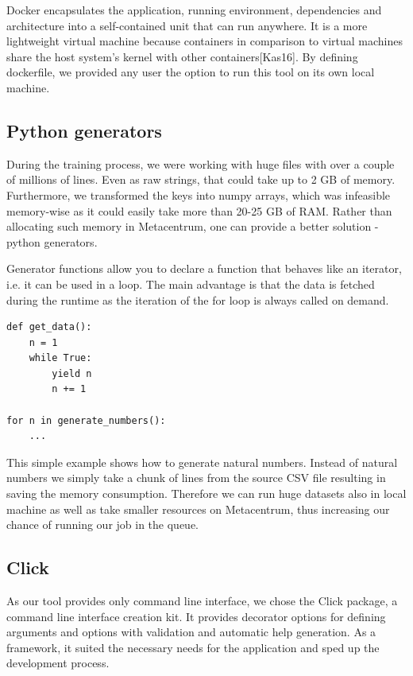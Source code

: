 Docker encapsulates the application, running environment, dependencies and architecture into a self-contained unit that can run anywhere. It is a more lightweight virtual machine because containers in comparison to virtual machines share the host system’s kernel with other containers[Kas16]. By defining dockerfile, we provided any user the option to run this tool on its own local machine.

\subsection{Python generators}

\label{python-generators}

During the training process, we were working with huge files with over a couple of millions of lines. Even as raw strings, that could take up to 2 GB of memory. Furthermore, we transformed the keys into numpy arrays, which was infeasible memory-wise as it could easily take more than 20-25 GB of RAM. Rather than allocating such memory in Metacentrum, one can provide a better solution - python generators\cite{python-gen}. 

Generator functions allow you to declare a function that behaves like an iterator, i.e. it can be used in a loop. The main advantage is that the data is fetched during the runtime as the iteration of the for loop is always called on demand.

\begin{verbatim}
def get_data():
    n = 1
    while True:
        yield n
        n += 1
		
for n in generate_numbers():
    ...
\end{verbatim}

This simple example shows how to generate natural numbers. Instead of natural numbers we simply take a chunk of lines from the source CSV file resulting in saving the memory consumption. Therefore we can run huge datasets also in local machine as well as take smaller resources on Metacentrum, thus increasing our chance of running our job in the queue.

\subsection{Click}

As our tool provides only command line interface, we chose the Click package\cite{click}, a command line interface creation kit. It provides decorator options for defining arguments and options with validation and automatic help generation. As a framework, it suited the necessary needs for the application and sped up the development process.

